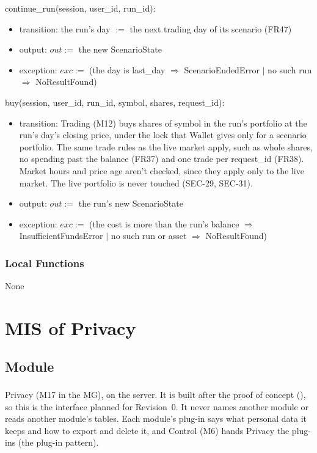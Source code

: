 \documentclass[12pt, titlepage]{article}
\begin{document}
\noindent continue\_run(session, user\_id, run\_id):
\begin{itemize}
\item transition: the run's day $:=$ the next trading day of its scenario
  (FR47)
\item output: $out :=$ the new ScenarioState
\item exception: $exc :=$ (the day is last\_day $\Rightarrow$
  ScenarioEndedError $|$ no such run $\Rightarrow$ NoResultFound)
\end{itemize}

\noindent buy(session, user\_id, run\_id, symbol, shares, request\_id):
\begin{itemize}
\item transition: Trading (M12) buys shares of symbol in the run's portfolio
  at the run's day's closing price, under the lock that Wallet gives only for
  a scenario portfolio. The same trade rules as the live market apply, such as
  whole shares, no spending past the balance (FR37) and one trade per
  request\_id (FR38). Market hours and price age aren't checked, since they
  apply only to the live market. The live portfolio is never touched
  (SEC-29, SEC-31).
\item output: $out :=$ the run's new ScenarioState
\item exception: $exc :=$ (the cost is more than the run's balance
  $\Rightarrow$ InsufficientFundsError $|$ no such run or asset $\Rightarrow$
  NoResultFound)
\end{itemize}

\subsubsection{Local Functions}

None

\par\endgroup

\newpage

\section{MIS of Privacy} \label{MisPrivacy}

\begingroup\raggedright
\subsection{Module}

Privacy (M17 in the MG), on the server. It is built after the proof of
concept (\textsuperscript{\dag}), so this is the interface planned for
Revision~0. It never names another module or reads another module's tables.
Each module's plug-in says what personal data it keeps and how to export and
delete it, and Control (M6) hands Privacy the plug-ins (the plug-in pattern).
\end{document}
